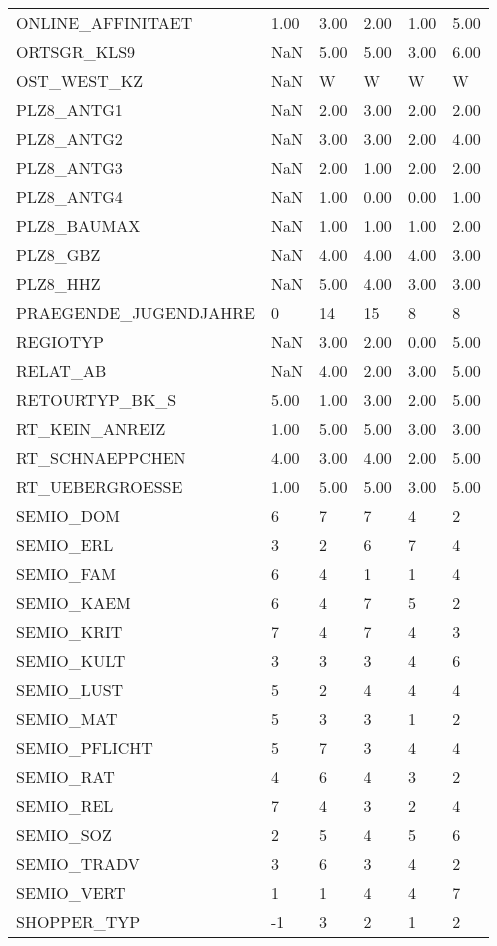 \begin{longtable}{lp{1cm}p{1cm}p{1cm}p{1cm}p{1cm}}
ONLINE\_AFFINITAET  &   1.00 & 3.00 & 2.00 & 1.00 & 5.00 \\
ORTSGR\_KLS9 & NaN & 5.00 & 5.00 & 3.00 & 6.00 \\
OST\_WEST\_KZ & NaN & W & W & W & W \\
PLZ8\_ANTG1 & NaN & 2.00 & 3.00 & 2.00 & 2.00 \\
PLZ8\_ANTG2 & NaN & 3.00 & 3.00 & 2.00 & 4.00 \\
PLZ8\_ANTG3 & NaN & 2.00 & 1.00 & 2.00 & 2.00 \\
PLZ8\_ANTG4 & NaN & 1.00 & 0.00 & 0.00 & 1.00 \\
PLZ8\_BAUMAX & NaN & 1.00 & 1.00 & 1.00 & 2.00 \\
PLZ8\_GBZ & NaN & 4.00 & 4.00 & 4.00 & 3.00 \\
PLZ8\_HHZ & NaN & 5.00 & 4.00 & 3.00 & 3.00 \\
PRAEGENDE\_JUGENDJAHRE   & 0 & 14 & 15 & 8 & 8 \\
REGIOTYP & NaN & 3.00 & 2.00 & 0.00 & 5.00 \\
RELAT\_AB & NaN & 4.00 & 2.00 & 3.00 & 5.00 \\
RETOURTYP\_BK\_S   &   5.00 & 1.00 & 3.00 & 2.00 & 5.00 \\
RT\_KEIN\_ANREIZ   &   1.00 & 5.00 & 5.00 & 3.00 & 3.00 \\
RT\_SCHNAEPPCHEN  &   4.00 & 3.00 & 4.00 & 2.00 & 5.00 \\
RT\_UEBERGROESSE  &   1.00 & 5.00 & 5.00 & 3.00 & 5.00 \\
SEMIO\_DOM & 6 & 7 & 7 & 4 & 2 \\
SEMIO\_ERL & 3 & 2 & 6 & 7 & 4 \\
SEMIO\_FAM & 6 & 4 & 1 & 1 & 4 \\
SEMIO\_KAEM & 6 & 4 & 7 & 5 & 2 \\
SEMIO\_KRIT & 7 & 4 & 7 & 4 & 3 \\
SEMIO\_KULT & 3 & 3 & 3 & 4 & 6 \\
SEMIO\_LUST & 5 & 2 & 4 & 4 & 4 \\
SEMIO\_MAT & 5 & 3 & 3 & 1 & 2 \\
SEMIO\_PFLICHT    & 5 & 7 & 3 & 4 & 4 \\
SEMIO\_RAT & 4 & 6 & 4 & 3 & 2 \\
SEMIO\_REL & 7 & 4 & 3 & 2 & 4 \\
SEMIO\_SOZ & 2 & 5 & 4 & 5 & 6 \\
SEMIO\_TRADV & 3 & 6 & 3 & 4 & 2 \\
SEMIO\_VERT & 1 & 1 & 4 & 4 & 7 \\
SHOPPER\_TYP &  -1 & 3 & 2 & 1 & 2 \\

\end{longtable}
